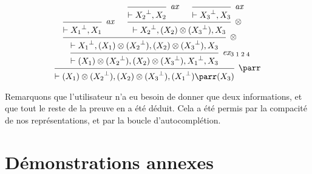 \documentclass[11pt,a4paper]{article}
\theoremstyle{plain}
\theoremstyle{definition}
\theoremstyle{remark}
\newcommand*{\orth}{^\perp}
\newcommand*{\tensor}{\otimes}
\newcommand*{\axv}[1]{\infer{0}[\ensuremath{\mathit{ax}}]{\vdash #1}}
\newcommand*{\tensorv}[1]{\infer{2}[\ensuremath{\tensor}]{\vdash #1}}
\newcommand*{\parrv}[1]{\infer{1}[\ensuremath{\parr}]{\vdash #1}}
\newcommand*{\permv}[2]{\infer{1}[\ensuremath{\textit{ex}_{#1}}]{\vdash #2}}
\begin{document}
\begin{equation*}
    \begin{prooftree}
          \axv{{X_1}\orth, X_1}
    
             \axv{{X_2}\orth, X_2}
    
             \axv{{X_3}\orth, X_3}
          \tensorv{{X_2}\orth, (X_2) \tensor ({X_3}\orth), X_3}
       \tensorv{{X_1}\orth, (X_1) \tensor ({X_2}\orth), (X_2) \tensor ({X_3}\orth), X_3}
       \permv{3 \;1 \;2 \;4}{(X_1) \tensor ({X_2}\orth), (X_2) \tensor ({X_3}\orth), {X_1}\orth, X_3}
    \parrv{(X_1) \tensor ({X_2}\orth), (X_2) \tensor ({X_3}\orth), ({X_1}\orth) \parr (X_3)}
    \end{prooftree}
\end{equation*}

Remarquons que l'utilisateur n'a eu besoin de donner que deux informations, et que tout le reste de la preuve en a été déduit. Cela a été permis par la compacité de nos représentations, et par la boucle d'autocomplétion.

\section{Démonstrations annexes}
\end{document}
